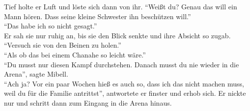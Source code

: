Tief holte er Luft und löste sich dann von ihr. ``Weißt du? Genau das will ein Mann hören. Dass 
seine kleine Schwester ihn beschützen will.''\\
``Das habe ich so nicht gesagt.''\\
Er sah sie nur ruhig an, bis sie den Blick senkte und ihre Absicht so zugab. \\
``Versuch sie von den Beinen zu holen.''\\
``Als ob das bei einem Chanahe so leicht wäre.''\\
``Du musst nur diesen Kampf durchstehen. Danach musst du nie wieder in die Arena'', sagte Mibell.\\
``Ach ja? Vor ein paar Wochen hieß es auch so, dass ich das nicht machen muss, weil du für die 
Familie antrittst'', antwortete er finster und erhob sich. Er nickte nur und schritt dann zum 
Eingang in die Arena hinaus. \\


